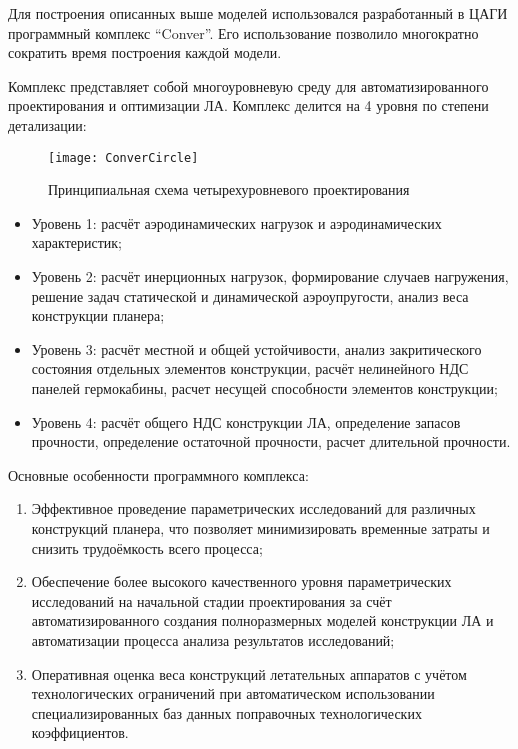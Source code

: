 \label{sec:Conver}

Для построения описанных выше моделей использовался разработанный в ЦАГИ программный комплекс ``Conver''. Его использование позволило многократно сократить время построения каждой модели. 

Комплекс представляет собой многоуровневую среду для автоматизированного проектирования и оптимизации ЛА. Комплекс делится на 4 уровня по степени детализации:



\begin{figure}[ht]
\centering
\texttt{[image: ConverCircle]} 
\caption{Принципиальная схема четырехуровневого проектирования}
\end{figure}



\begin{itemize}
\item Уровень 1: расчёт аэродинамических нагрузок и аэродинамических характеристик; 
\item Уровень 2: расчёт инерционных нагрузок, формирование случаев нагружения, решение задач статической и динамической аэроупругости, анализ веса конструкции планера;
\item Уровень 3: расчёт местной и общей устойчивости, анализ закритического состояния отдельных элементов конструкции, расчёт нелинейного НДС панелей гермокабины, расчет несущей способности элементов конструкции;
\item Уровень 4: расчёт общего НДС конструкции ЛА, определение запасов прочности, определение остаточной прочности, расчет длительной прочности.
\end{itemize}

Основные особенности программного комплекса:

\begin{enumerate}
\item Эффективное проведение параметрических исследований для различных конструкций планера, что позволяет минимизировать временные затраты и снизить трудоёмкость всего процесса;
\item Обеспечение более высокого качественного уровня параметрических исследований на начальной стадии проектирования за счёт автоматизированного создания полноразмерных моделей конструкции ЛА и автоматизации процесса анализа результатов исследований;
\item Оперативная оценка веса конструкций летательных аппаратов с учётом технологических ограничений при автоматическом использовании специализированных баз данных поправочных технологических коэффициентов.
\end{enumerate}



%